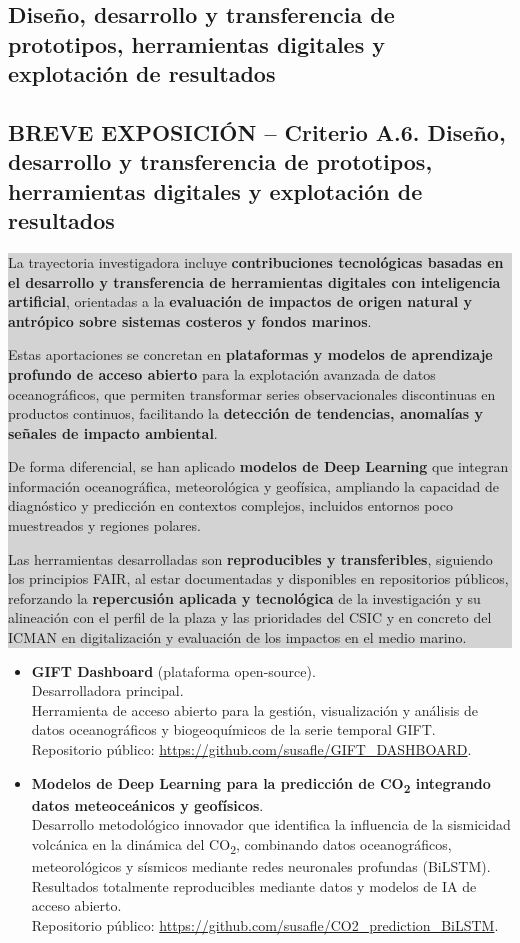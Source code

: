 \documentclass[11pt,a4paper]{article}
\newcommand{\breveexposicion}[2]{
    \subsection*{\color{darkgray}\textbf{BREVE EXPOSICIÓN -- #1}}
    \vspace{0.3em}
    \noindent\colorbox{lightgray}{%
        \begin{minipage}{0.97\textwidth}
        \vspace{0.5em}
        \color{darkgray}
        #2
        \vspace{0.5em}
        \end{minipage}
    }
    \vspace{1em}
}
\begin{document}
\subsection{Diseño, desarrollo y transferencia de prototipos, herramientas digitales y explotación de resultados}

\breveexposicion{Criterio A.6. Diseño, desarrollo y transferencia de prototipos, herramientas digitales y explotación de resultados}{
La trayectoria investigadora incluye \textbf{contribuciones tecnológicas basadas en el desarrollo y transferencia de herramientas digitales con inteligencia artificial}, orientadas a la \textbf{evaluación de impactos de origen natural y antrópico sobre sistemas costeros y fondos marinos}.

Estas aportaciones se concretan en \textbf{plataformas y modelos de aprendizaje profundo de acceso abierto} para la explotación avanzada de datos oceanográficos, que permiten transformar series observacionales discontinuas en productos continuos, facilitando la \textbf{detección de tendencias, anomalías y señales de impacto ambiental}.

De forma diferencial, se han aplicado \textbf{modelos de Deep Learning} que integran información oceanográfica, meteorológica y geofísica, ampliando la capacidad de diagnóstico y predicción en contextos complejos, incluidos entornos poco muestreados y regiones polares.

Las herramientas desarrolladas son \textbf{reproducibles y transferibles}, siguiendo los principios FAIR, al estar documentadas y disponibles en repositorios públicos, reforzando la \textbf{repercusión aplicada y tecnológica} de la investigación y su alineación con el perfil de la plaza y las prioridades del CSIC y en concreto del ICMAN en digitalización y evaluación de los impactos en el medio marino.
}

\begin{itemize}[leftmargin=*]

    \item \textbf{GIFT Dashboard} (plataforma open-source).\\
    Desarrolladora principal.\\
    Herramienta de acceso abierto para la gestión, visualización y análisis de datos oceanográficos y biogeoquímicos de la serie temporal GIFT.\\
    Repositorio público: \url{https://github.com/susafle/GIFT_DASHBOARD}.

    \item \textbf{Modelos de Deep Learning para la predicción de CO\textsubscript{2} integrando datos meteoceánicos y geofísicos}.\\
    Desarrollo metodológico innovador que identifica la influencia de la sismicidad volcánica en la dinámica del CO\textsubscript{2}, combinando datos oceanográficos, meteorológicos y sísmicos mediante redes neuronales profundas (BiLSTM).\\
    Resultados totalmente reproducibles mediante datos y modelos de IA de acceso abierto.\\
    Repositorio público: \url{https://github.com/susafle/CO2_prediction_BiLSTM}.

\end{itemize}
\end{document}
